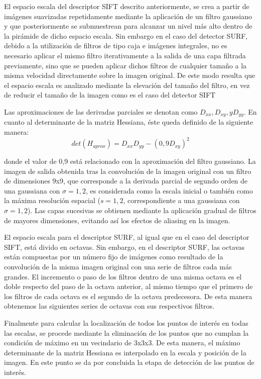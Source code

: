 El espacio escala del descriptor SIFT descrito anteriormente, se crea a partir de imágenes suavizadas repetidamente mediante la aplicación de un filtro gaussiano y que posteriormente se submuestrean para alcanzar un nivel más alto dentro de la pirámide de dicho espacio escala. Sin embargo en el caso del detector SURF, debido a la utilización de filtros de tipo caja e imágenes integrales, no es necesario aplicar el mismo filtro iterativamente a la salida de una capa filtrada previamente, sino que se pueden aplicar dichos filtros de cualquier tamaño a la misma velocidad directamente sobre la imagen original. De este modo resulta que el espacio escala es analizado mediante la elevación del tamaño del filtro, en vez de reducir el tamaño de la imagen como es el caso del detector SIFT

Las aproximaciones de las derivadas parciales se denotan como $D_{xx} , D_{xy} , y D_{yy}$. En cuanto al determinante de la matriz Hessiana, éste queda definido de la siguiente manera:
\begin{equation}
  det(H_{aprox}) = D_{xx} D_{yy} - (0,9 D_{xy})^2
\end{equation}

donde el valor de 0,9 está relacionado con la aproximación del filtro gaussiano. La imagen de salida obtenida tras la convolución de la imagen original con un filtro de dimensiones 9x9, que corresponde a la derivada parcial de segundo orden de una gaussiana con $\sigma = 1,2$, es considerada como la escala inicial o también como la máxima resolución espacial ($s = 1,2$, correspondiente a una gaussiana con $\sigma = 1,2$). Las capas sucesivas se obtienen mediante la aplicación gradual de filtros de mayores dimensiones, evitando así los efectos de aliasing en la imagen.

El espacio escala para el descriptor SURF, al igual que en el caso del descriptor SIFT, está divido en octavas. Sin embargo, en el descriptor SURF, las octavas están compuestas por un número fijo de imágenes como resultado de la convolución de la misma imagen original con una serie de filtros cada más grandes. El incremento o paso de los filtros dentro de una misma octava es el doble respecto del paso de la octava anterior, al mismo tiempo que el primero de los filtros de cada octava es el segundo de la octava predecesora. De esta manera obtenemos las siguientes series de octavas con sus respectivos filtros.

Finalmente para calcular la localización de todos los puntos de interés en todas las escalas, se procede mediante la eliminación de los puntos que no cumplan la condición de máximo en un vecindario de 3x3x3. De esta manera, el máximo determinante de la matriz Hessiana es interpolado en la escala y posición de la imagen. En este punto se da por concluida la etapa de detección de los puntos de interés.

